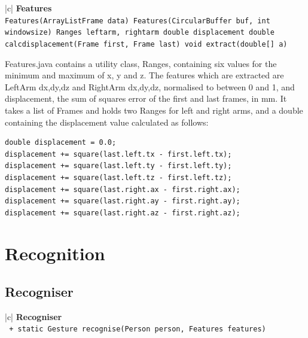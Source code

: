 \documentclass[12pt,a4,notitlepage]{report}
\renewcommand{\_}{\texttt{\symbol{95}}}
\newcommand{\<}{\texttt{\symbol{60}}}
\renewcommand{\>}{\texttt{\symbol{62}}}
\newcommand{\class}[1]{\textbf{#1}}
\newcommand{\variable}[1]{\texttt{#1}}
\begin{document}
\begin{tabular}{|c|} \hline 
\class{Features} \\ \hline
{}
{\variable{Features(ArrayList\<Frame\> data) \newline
Features(CircularBuffer buf, int windowsize) \newline
Ranges leftarm, rightarm \newline
double displacement \newline
double calc\_displacement(Frame first, Frame last) \newline
void extract(double[] a)
} } \\ \hline
\end{tabular}

Features.java contains a utility class, Ranges, containing six values for the minimum and maximum of x, y and z. The features which are extracted are LeftArm {dx,dy,dz} and RightArm {dx,dy,dz}, normalised to between 0 and 1, and displacement, the sum of squares error of the first and last frames, in mm. It takes a list of Frames and holds two Ranges for left and right arms, and a double containing the displacement value calculated as follows:

\begin{verbatim}
double displacement = 0.0;
displacement += square(last.left.tx - first.left.tx);
displacement += square(last.left.ty - first.left.ty);
displacement += square(last.left.tz - first.left.tz);
displacement += square(last.right.ax - first.right.ax);
displacement += square(last.right.ay - first.right.ay);
displacement += square(last.right.az - first.right.az);
\end{verbatim}

\newpage

\section{Recognition}

\subsection{Recogniser}

\begin{tabular}{|c|} \hline 
\class{Recogniser} \\ \hline
{}
{\variable{
+ static Gesture recognise(Person person, Features features)
 } } \\
\hline
\end{tabular}
\end{document}
